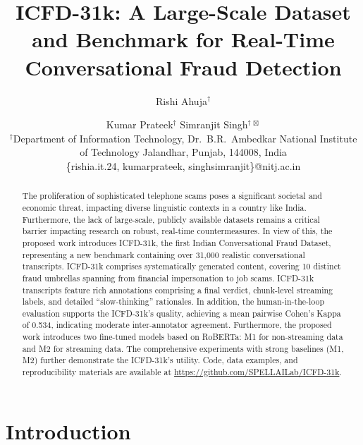 \documentclass{article}
\title{ICFD-31k: A Large-Scale Dataset and Benchmark for Real-Time
Conversational Fraud Detection}
\author{
Rishi Ahuja$^{\dagger}$
\and
Kumar Prateek$^{\dagger}$
\And
Simranjit Singh$^{\dagger\,\boxtimes}$\\
\affiliations
$^{\dagger}$Department of Information Technology,
Dr.\ B.R.\ Ambedkar National Institute of Technology Jalandhar,
Punjab, 144008, India\\
\emails
\{rishia.it.24, kumarprateek, singhsimranjit\}@nitj.ac.in
}
\newcommand{\crchange}[1]{{\color{blue}#1}}
\begin{document}
\maketitle

\begin{abstract}
    The proliferation of sophisticated telephone scams poses a significant societal and economic threat, impacting diverse linguistic contexts in a country like India. Furthermore, the lack of large-scale, publicly available datasets remains a critical barrier impacting research on robust, real-time countermeasures. In view of this, the proposed work introduces ICFD-31k, the first Indian Conversational Fraud Dataset, representing a new benchmark containing over 31,000 realistic conversational transcripts. ICFD-31k comprises systematically generated content, covering 10 distinct fraud umbrellas spanning from financial impersonation to job scams. ICFD-31k transcripts feature rich annotations comprising a final verdict, chunk-level streaming labels, and detailed ``slow-thinking'' rationales. In addition, the human-in-the-loop evaluation supports the ICFD-31k's quality, achieving a mean pairwise Cohen's Kappa of 0.534, indicating moderate inter-annotator agreement. Furthermore, the proposed work introduces two fine-tuned models based on RoBERTa: M1 for non-streaming data and M2 for streaming data. The comprehensive experiments with strong baselines (M1, M2) further demonstrate the ICFD-31k's utility. \crchange{Code, data examples, and reproducibility materials are available at \url{https://github.com/SPELLAILab/ICFD-31k}.}
\end{abstract}

\section{Introduction}
\label{sec:intro}
\end{document}
